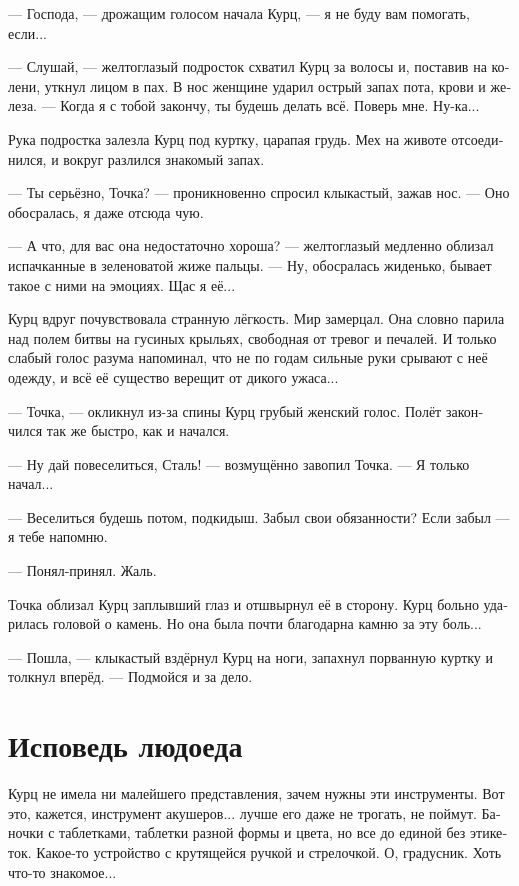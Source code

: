 \documentclass[a4paper,12pt,fleqn]{book}\usepackage{cooltooltips}\usepackage{polyglossia}\setdefaultlanguage[babelshorthands=true]{russian}\setotherlanguage{english}\defaultfontfeatures{Ligatures=TeX,Mapping=tex-text} \usepackage{xcolor}\definecolor{lightgray}{HTML}{bbbbbb}\color{lightgray}\newcommand{\ml}[3]{\textenglish{\textcolor{black}{#3}}}
\begin{document}
--- Господа, --- дрожащим голосом начала Курц, --- я не буду вам помогать, если...

--- Слушай, --- желтоглазый подросток схватил Курц за волосы и, поставив на колени, уткнул лицом в пах.
В нос женщине ударил острый запах пота, крови и железа.
--- Когда я с тобой закончу, ты будешь делать всё.
Поверь мне.
Ну-ка...

Рука подростка залезла Курц под куртку, царапая грудь.
Мех на животе отсоединился, и вокруг разлился знакомый запах.

--- Ты серьёзно, Точка? --- проникновенно спросил клыкастый, зажав нос.
--- Оно обосралась, я даже отсюда чую.

--- А что, для вас она недостаточно хороша? --- желтоглазый медленно облизал испачканные в зеленоватой жиже пальцы.
--- Ну, обосралась жиденько, бывает такое с ними на эмоциях.
Щас я её...

Курц вдруг почувствовала странную лёгкость.
Мир замерцал.
Она словно парила над полем битвы на гусиных крыльях, свободная от тревог и печалей.
И только слабый голос разума напоминал, что не по годам сильные руки срывают с неё одежду, и всё её существо верещит от дикого ужаса...

--- Точка, --- окликнул из-за спины Курц грубый женский голос.
Полёт закончился так же быстро, как и начался.

--- Ну дай повеселиться, Сталь! --- возмущённо завопил Точка.
--- Я только начал...

--- Веселиться будешь потом, подкидыш.
Забыл свои обязанности?
Если забыл --- я тебе напомню.

--- Понял-принял.
Жаль.

Точка облизал Курц заплывший глаз и отшвырнул её в сторону.
Курц больно ударилась головой о камень.
Но она была почти благодарна камню за эту боль...

--- Пошла, --- клыкастый вздёрнул Курц на ноги, запахнул порванную куртку и толкнул вперёд.
--- Подмойся и за дело.

\section{Исповедь людоеда}

Курц не имела ни малейшего представления, зачем нужны эти инструменты.
Вот это, кажется, инструмент акушеров... лучше его даже не трогать, не поймут.
Баночки с таблетками, таблетки разной формы и цвета, но все до единой без этикеток.
Какое-то устройство с крутящейся ручкой и стрелочкой.
О, градусник.
Хоть что-то знакомое...
\end{document}
